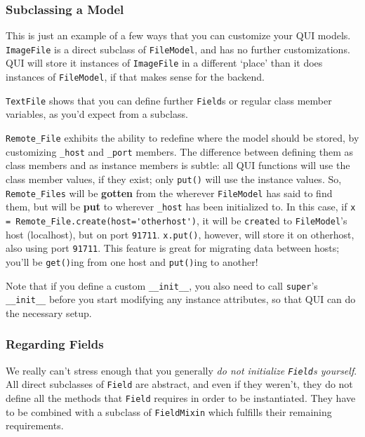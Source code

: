 \documentclass{article} %
\newcommand{\il}[1]{\lstinline{#1}}
\begin{document}
\subsubsection{Subclassing a Model}
This is just an example of a few ways that you can customize your QUI models. \il{ImageFile} is a direct subclass of \il{FileModel}, and has no further customizations.
QUI will store it instances of \il{ImageFile} in a different `place' than it does instances of \il{FileModel}, if that makes sense for the backend.

\il{TextFile} shows that you can define further \il{Field}s or regular class member variables, as you'd expect from a subclass.

\il{Remote_File} exhibits the ability to redefine where the model should be stored, by customizing \il{_host} and \il{_port} members. The difference between defining them as class members and as instance members is subtle: all QUI functions will use the class member values, if they exist; only \il{put()} will use the instance values. So, \il{Remote_Files} will be \textbf{gotten} from the wherever \il{FileModel} has said to find them, but will be \textbf{put} to wherever \il{_host} has been initialized to. In this case, if \il{x = Remote_File.create(host='otherhost')}, it will be \il{create}d to \il{FileModel}'s host (localhost), but on port \il{91711}. \il{x.put()}, however, will store it on otherhost, also using port \il{91711}. This feature is great for migrating data between hosts; you'll be \il{get()}ing from one host and \il{put()}ing to another!

Note that if you define a custom \il{__init__}, you also need to call \il{super}'s \il{__init__}  before you start modifying any instance attributes, so that QUI can do the necessary setup.

\subsubsection{Regarding Fields}
We really can't stress enough that you generally \emph{do not initialize \il{Field}s yourself}. All direct subclasses of \il{Field} are abstract, and even if they weren't, they do not define all the methods that \il{Field} requires in order to be instantiated. They have to be combined with a subclass of \il{FieldMixin} which fulfills their remaining requirements.
\end{document}
